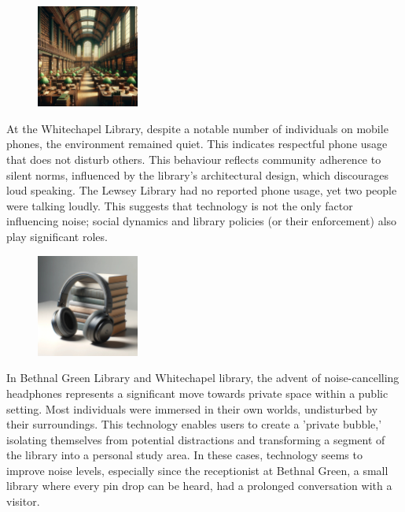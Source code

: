\documentclass{novel}
\begin{document}
\begin{figure} 
\vspace{-\intextsep}
    \includegraphics[width=0.3\textwidth]{resources/whitechapel.jpg}
    \vspace{-50pt} %
\end{figure}
At the Whitechapel Library, despite a notable number of individuals on mobile phones, the environment remained quiet. This indicates respectful phone usage that does not disturb others. This behaviour reflects community adherence to silent norms, influenced by the library's architectural design, which discourages loud speaking. The Lewsey Library had no reported phone usage, yet two people were talking loudly. This suggests that technology is not the only factor influencing noise; social dynamics and library policies (or their enforcement) also play significant roles.

\begin{figure} 
    \includegraphics[width=0.3\textwidth]{resources/headphones.jpg}
\end{figure}
In Bethnal Green Library and Whitechapel library, the advent of noise-cancelling headphones represents a significant move towards private space within a public setting. Most individuals were immersed in their own worlds, undisturbed by their surroundings. This technology enables users to create a 'private bubble,' isolating themselves from potential distractions and transforming a segment of the library into a personal study area. In these cases, technology seems to improve noise levels, especially since the receptionist at Bethnal Green, a small library where every pin drop can be heard, had a prolonged conversation with a visitor.
\end{document}
